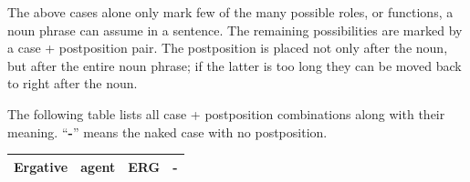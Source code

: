 \documentclass[10pt,oneside]{memoir}
\begin{document}
The above cases alone only mark few of the many possible roles, or functions, a noun phrase can assume in a sentence. The remaining possibilities are marked by a case + postposition pair. The postposition is placed not only after the noun, but after the entire noun phrase; if the latter is too long they can be moved back to right after the noun.

The following table lists all case + postposition combinations along with their meaning. ``\textbf{-}'' means the naked case with no postposition.

\newcommand{\xline}{\cline{1-2}\cline{4-4}}

\begin{center}
    \begin{tabular}[]{ |  c | c | c | >{\bfseries}c | }
    \hline
Ergative & agent & ERG & -\\\hline \hline


\end{tabular}
\end{center}
\end{document}
